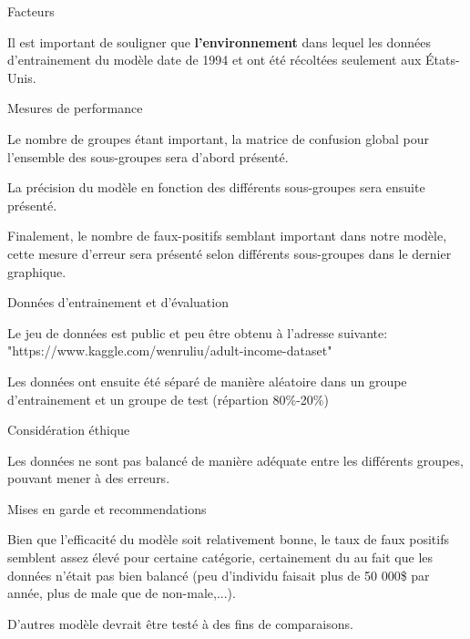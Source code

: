 \documentclass{article}
\begin{document}
\begin{adjustwidth}{-60pt}{-70pt}
\begin{singlespace}
\begin{tcolorbox}[title=\textbf{Model Card -Antoine Savage-Duguay},
    breakable, sharp corners, boxrule=0.7pt]
{\begin{mcsection}{Facteurs}
    \item Il est important de souligner que \textbf{l'environnement} dans lequel les données d'entrainement du modèle date de 1994 et ont été récoltées seulement aux États-Unis.
\end{mcsection}

\begin{mcsection}{Mesures de performance}
    \item Le nombre de groupes étant important, la matrice de confusion global pour l'ensemble des sous-groupes sera d'abord présenté. 
    \item La précision du modèle en fonction des différents sous-groupes sera ensuite présenté. 
    \item Finalement, le nombre de faux-positifs semblant important dans notre modèle, cette mesure d'erreur sera présenté selon différents sous-groupes dans le dernier graphique.
\end{mcsection}

\begin{mcsection}{Données d'entrainement et d'évaluation}
    \item Le jeu de données est public et peu être obtenu à l'adresse suivante: "https://www.kaggle.com/wenruliu/adult-income-dataset"
    \item Les données ont ensuite été séparé de manière aléatoire dans un groupe d'entrainement et un groupe de test (répartion 80\%-20\%)
\end{mcsection}

\pagebreak


\begin{mcsection}{Considération éthique}
    \item Les données ne sont pas balancé de manière adéquate entre les différents groupes, pouvant mener à des erreurs.
\end{mcsection}

\begin{mcsection}{Mises en garde et recommendations }
\item Bien que l'efficacité du modèle soit relativement bonne, le taux de faux positifs semblent assez élevé pour certaine catégorie, certainement du au fait que les données n'était pas bien balancé (peu d'individu faisait plus de 50 000\$ par année, plus de male que de non-male,...).
\item D'autres modèle devrait être testé à des fins de comparaisons.

\end{mcsection}

}
\end{tcolorbox}
\end{singlespace}
\end{adjustwidth}
\end{document}
